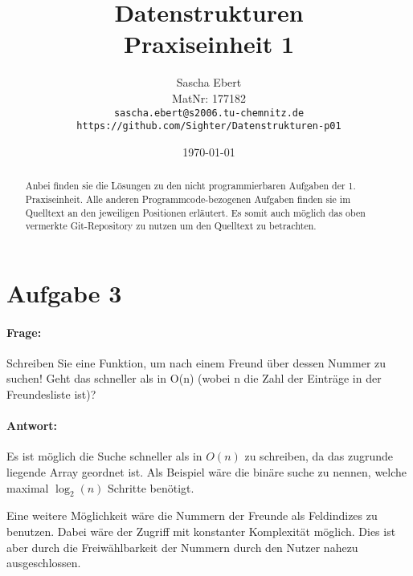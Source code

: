 \documentclass{article}
\title{Datenstrukturen\\Praxiseinheit 1}
\author
{
	Sascha Ebert\\
	MatNr: 177182\\
	\texttt{sascha.ebert@s2006.tu-chemnitz.de}\\
	\texttt{https://github.com/Sighter/Datenstrukturen-p01}\\
}
\date{\today}
\begin{document}
\maketitle

\begin{abstract}
Anbei finden sie die Lösungen zu den nicht programmierbaren Aufgaben der 1. Praxiseinheit.
Alle anderen Programmcode-bezogenen Aufgaben finden sie im Quelltext an den jeweiligen Positionen
erläutert. Es somit auch möglich das oben vermerkte Git-Repository zu nutzen um den Quelltext
zu betrachten.
\end{abstract}

\section*{Aufgabe 3}
\paragraph{Frage:}
Schreiben Sie eine Funktion, um nach einem Freund über dessen Nummer zu suchen!
Geht das schneller als in O(n) (wobei n die Zahl der Einträge in der Freundesliste ist)?

\paragraph{Antwort:}
Es ist möglich die Suche schneller als in \(O(n)\) zu schreiben, da das zugrunde liegende Array
geordnet ist. Als Beispiel wäre die binäre suche zu nennen, welche maximal \(\log_{2}(n)\) Schritte
benötigt.

Eine weitere Möglichkeit wäre die Nummern der Freunde als Feldindizes zu benutzen. Dabei wäre der Zugriff
mit konstanter Komplexität möglich. Dies ist aber durch die Freiwählbarkeit der Nummern durch den Nutzer
nahezu ausgeschlossen.
\end{document}
